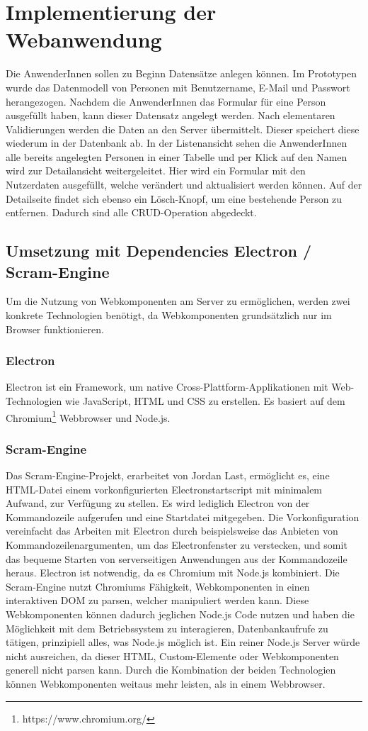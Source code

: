 \chapter{Implementierung der Webanwendung}

Die AnwenderInnen sollen zu Beginn Datensätze anlegen können. Im Prototypen wurde das Datenmodell von Personen mit Benutzername, E-Mail und Passwort herangezogen.
Nachdem die AnwenderInnen das Formular für eine Person ausgefüllt haben, kann dieser Datensatz angelegt werden. Nach elementaren Validierungen werden die Daten an den Server übermittelt. Dieser speichert diese wiederum in der Datenbank ab. 
In der Listenansicht sehen die AnwenderInnen alle bereits angelegten Personen in einer Tabelle und per Klick auf den Namen wird zur Detailansicht weitergeleitet. Hier wird ein Formular mit den Nutzerdaten ausgefüllt, welche verändert und aktualisiert werden können.   
Auf der Detailseite findet sich ebenso ein Lösch-Knopf, um eine bestehende Person zu entfernen. Dadurch sind alle CRUD-Operation abgedeckt.
\section{Umsetzung mit Dependencies Electron / Scram-Engine}
Um die Nutzung von Webkomponenten am Server zu ermöglichen, werden zwei konkrete Technologien benötigt, da Webkomponenten grundsätzlich nur im Browser funktionieren.
\subsection{Electron}
Electron ist ein Framework, um native Cross-Plattform-Applikationen mit Web-Technologien wie JavaScript, HTML und CSS zu erstellen. Es basiert auf dem Chromium\footnote{https://www.chromium.org/} Webbrowser und Node.js.
\subsection{Scram-Engine}
\label{cha:scram-engine}
Das Scram-Engine-Projekt, erarbeitet von Jordan Last, ermöglicht es, eine HTML-Datei einem vorkonfigurierten Electronstartscript mit minimalem Aufwand, zur Verfügung zu stellen. Es wird lediglich Electron von der Kommandozeile aufgerufen und eine Startdatei mitgegeben. Die Vorkonfiguration vereinfacht das Arbeiten mit Electron durch beispielsweise das Anbieten von Kommandozeilenargumenten, um das Electronfenster zu verstecken, und somit das bequeme Starten von serverseitigen Anwendungen aus der Kommandozeile heraus.
Electron ist notwendig, da es Chromium mit Node.js kombiniert. Die Scram-Engine nutzt Chromiums Fähigkeit, Webkomponenten in einen interaktiven DOM zu parsen, welcher manipuliert werden kann. Diese Webkomponenten können dadurch jeglichen Node.js Code nutzen und haben die Möglichkeit mit dem Betriebssystem zu interagieren, Datenbankaufrufe zu tätigen, prinzipiell alles, was Node.js möglich ist.
Ein reiner Node.js Server würde nicht ausreichen, da dieser HTML, Custom-Elemente oder Webkomponenten generell nicht parsen kann.
Durch die Kombination der beiden Technologien können Webkomponenten weitaus mehr leisten, als in einem Webbrowser.

